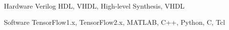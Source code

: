 


\begin{cvskills}


\cvskill
{Hardware} %
{Verilog HDL, VHDL, High-level Synthesis, VHDL} %


\cvskill
{Software} %
{TensorFlow1.x, TensorFlow2.x, MATLAB, C++, Python, C, Tcl} %




\end{cvskills}
